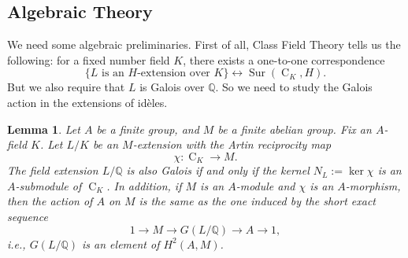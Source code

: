 \documentclass{amsart}
\numberwithin{equation}{section}
\theoremstyle{plain}
\newtheorem{lemma}[theorem]{Lemma}
\theoremstyle{definition}
\theoremstyle{remark}
\begin{document}
\subsection{Algebraic Theory}
We need some algebraic preliminaries.
First of all, Class Field Theory tells us the following:
for a fixed number field $K$, there exists a one-to-one correspondence
\begin{equation*}
	\{L\text{ is an }H\text{-extension over }K\}\leftrightarrow\operatorname{Sur}(\operatorname{C}_K,H).
\end{equation*}
But we also require that $L$ is Galois over $\mathbb{Q}$.
So we need to study the Galois action in the extensions of id{\`e}les.
\begin{lemma}\label{lemma: CFT galois action on idele}
	Let $A$ be a finite group, and $M$ be a finite abelian group.
    Fix an $A$-field $K$.
    Let $L/K$ be an $M$-extension with the Artin reciprocity map
	\begin{equation*}
		\chi:\operatorname{C}_K\to M.
	\end{equation*}
	The field extension $L/\mathbb{Q}$ is also Galois if and only if the kernel $N_L:=\ker\chi$ is an $A$-submodule of $\operatorname{C}_K$.
    In addition, if $M$ is an $A$-module and $\chi$ is an $A$-morphism, then the action of $A$ on $M$ is the same as the one induced by the short exact sequence
    \begin{equation*}
        1\to M\to G(L/\mathbb{Q})\to A\to1,
    \end{equation*}
    i.e., $G(L/\mathbb{Q})$ is an element of $H^2(A,M)$.
\end{lemma}
\end{document}
